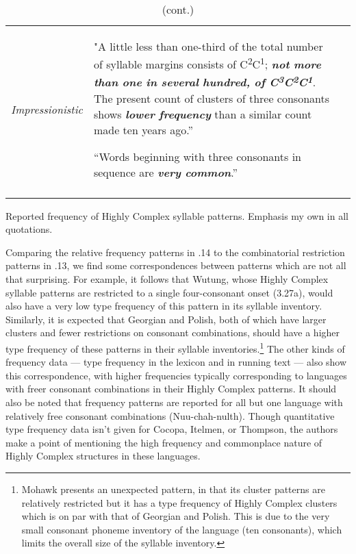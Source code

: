 \begin{table}
\begin{tabularx}{\textwidth}{XXX}
\textit{Impressionistic} & "A little less than one-third of the total number of syllable margins consists of C\textsuperscript{2}C\textsuperscript{1}; \textbf{\textit{not} \textit{more} \textit{than} \textit{one} \textit{in} \textit{several} \textit{hundred,} \textit{of} \textit{C}}\textbf{\textit{\textsuperscript{3}}}\textbf{\textit{C}}\textbf{\textit{\textsuperscript{2}}}\textbf{\textit{C}}\textbf{\textit{\textsuperscript{1}}}. The present count of clusters of three consonants shows \textbf{\textit{lower} \textit{frequency}} than a similar count made ten years ago.” \citep[24]{Matteson1965}

“Words beginning with three consonants in sequence are \textbf{\textit{very} \textit{common}}.” \citep[26]{Hanson2010}\\
\lspbottomrule
\end{tabularx}
{{\caption{\label{tab:key:3.14} (cont.)} Reported frequency of Highly Complex syllable patterns. Emphasis my own in all quotations.}}
\end{table}




  Comparing the relative frequency patterns in .14 to the combinatorial restriction patterns in .13, we find some correspondences between patterns which are not all that surprising. For example, it follows that Wutung, whose Highly Complex syllable patterns are restricted to a single four-consonant onset (3.27a), would also have a very low type frequency of this pattern in its syllable inventory. Similarly, it is expected that Georgian and Polish, both of which have larger clusters and fewer restrictions on consonant combinations, should have a higher type frequency of these patterns in their syllable inventories.\footnote{ \textrm{Mohawk presents an unexpected pattern, in that its cluster patterns are relatively restricted but it has a type frequency of Highly Complex clusters which is on par with that of Georgian and Polish. This is due to the very small consonant phoneme inventory of the language (ten consonants), which limits the overall size of the syllable inventory.}} The other kinds of frequency data — type frequency in the lexicon and in running text — also show this correspondence, with higher frequencies typically corresponding to languages with freer consonant combinations in their Highly Complex patterns. It should also be noted that frequency patterns are reported for all but one language with relatively free consonant combinations (Nuu-chah-nulth). Though quantitative type frequency data isn’t given for Cocopa, Itelmen, or Thompson, the authors make a point of mentioning the high frequency and commonplace nature of Highly Complex structures in these languages. 



